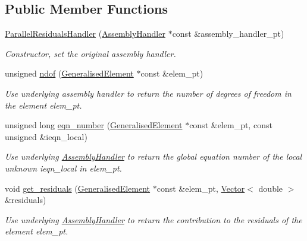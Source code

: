\subsection*{Public Member Functions}
\begin{DoxyCompactItemize}
\item 
\hyperlink{classoomph_1_1ParallelResidualsHandler_a900d86e1f8e9f4fa9369b0afec456b22}{Parallel\+Residuals\+Handler} (\hyperlink{classoomph_1_1AssemblyHandler}{Assembly\+Handler} $\ast$const \&assembly\+\_\+handler\+\_\+pt)
\begin{DoxyCompactList}\small\item\em Constructor, set the original assembly handler. \end{DoxyCompactList}\item 
unsigned \hyperlink{classoomph_1_1ParallelResidualsHandler_a16eb9ec097e85c5da57b2e588d9683b6}{ndof} (\hyperlink{classoomph_1_1GeneralisedElement}{Generalised\+Element} $\ast$const \&elem\+\_\+pt)
\begin{DoxyCompactList}\small\item\em Use underlying assembly handler to return the number of degrees of freedom in the element elem\+\_\+pt. \end{DoxyCompactList}\item 
unsigned long \hyperlink{classoomph_1_1ParallelResidualsHandler_a0541d552e54eb2ca8681054180eafb87}{eqn\+\_\+number} (\hyperlink{classoomph_1_1GeneralisedElement}{Generalised\+Element} $\ast$const \&elem\+\_\+pt, const unsigned \&ieqn\+\_\+local)
\begin{DoxyCompactList}\small\item\em Use underlying \hyperlink{classoomph_1_1AssemblyHandler}{Assembly\+Handler} to return the global equation number of the local unknown ieqn\+\_\+local in elem\+\_\+pt. \end{DoxyCompactList}\item 
void \hyperlink{classoomph_1_1ParallelResidualsHandler_a9a4e40b86cfb1db2b4c770d8d7241ad1}{get\+\_\+residuals} (\hyperlink{classoomph_1_1GeneralisedElement}{Generalised\+Element} $\ast$const \&elem\+\_\+pt, \hyperlink{classoomph_1_1Vector}{Vector}$<$ double $>$ \&residuals)
\begin{DoxyCompactList}\small\item\em Use underlying \hyperlink{classoomph_1_1AssemblyHandler}{Assembly\+Handler} to return the contribution to the residuals of the element elem\+\_\+pt. \end{DoxyCompactList}\item 

\end{DoxyCompactItemize}
